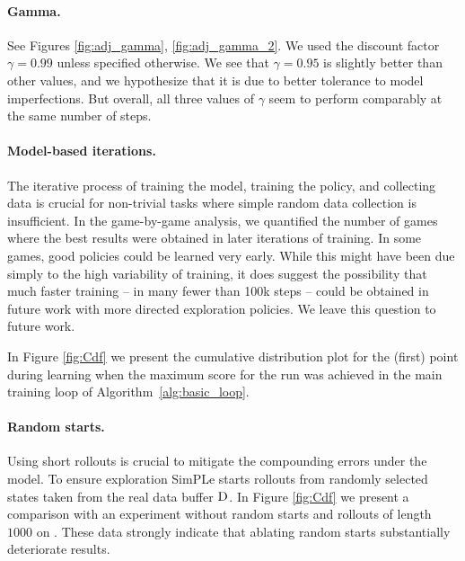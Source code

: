 \paragraph{Gamma.} See Figures \ref{fig:adj_gamma}, \ref{fig:adj_gamma_2}. We used the discount factor $\gamma=0.99$ unless specified otherwise.  We see that $\gamma=0.95$ is slightly better than other values, and we hypothesize that it is due to better tolerance to model imperfections. But overall, all three values of $\gamma$ seem to perform comparably at the same number of steps.

\paragraph{Model-based iterations.}
The iterative process of training the model, training the policy, and collecting data is crucial for non-trivial tasks where simple random data collection is insufficient. In the game-by-game analysis, we quantified the number of games where the best results were obtained in later iterations of training. In some games, good policies could be learned very early. While this might have been due simply to the high variability of training, it does suggest the possibility that much faster training -- in many fewer than 100k steps -- could be obtained in future work with more directed exploration policies. We leave this question to future work.

In Figure \ref{fig:Cdf} we present the cumulative distribution plot for the (first) point during learning when the maximum score for the run was achieved in the main training loop of Algorithm~\ref{alg:basic_loop}.

\paragraph{Random starts.} Using short rollouts is crucial to mitigate the compounding errors under the model. To ensure exploration SimPLe starts rollouts from randomly selected states taken from the real data buffer $\textsc{D}$. In Figure \ref{fig:Cdf} we present a comparison with an experiment without random starts and rollouts of length $1000$ on \seaquest. These data strongly indicate that ablating random starts substantially deteriorate results.  

